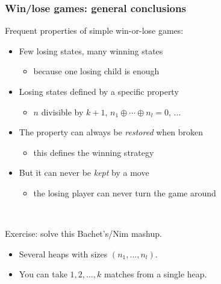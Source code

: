 \documentclass[12pt]{beamer}
\begin{document}
\begin{frame}
\frametitle{Win/lose games: general conclusions}
Frequent properties of simple win-or-lose games:
\begin{itemize}
\item Few losing states, many winning states
\begin{itemize} \item because one losing child is enough \end{itemize}
\item Losing states defined by a specific property
\begin{itemize} \item $n$ divisible by $k+1$, $n_1 \oplus \cdots \oplus n_l = 0$, ... \end{itemize}
\item The property can always be \emph{restored} when broken
\begin{itemize} \item this defines the winning strategy \end{itemize}
\item But it can never be \emph{kept} by a move
\begin{itemize} \item the losing player can never turn the game around \end{itemize}
\end{itemize}

~

Exercise: solve this Bachet's/Nim mashup.
\begin{itemize}
\item Several heaps with sizes $(n_1,\ldots,n_l)$.
\item You can take $1,2,\ldots,k$ matches from a single heap.
\end{itemize}
\end{frame}
\end{document}
